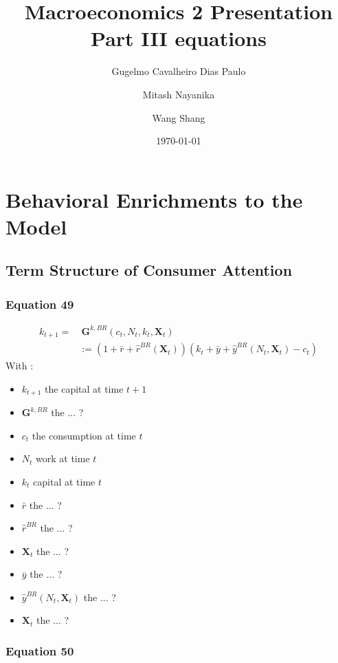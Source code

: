 \documentclass{article}
\title{Macroeconomics 2 Presentation \\ Part III equations}
\author{Gugelmo Cavalheiro Dias Paulo \\ \and Mitash Nayanika \\ \and Wang Shang}
\date{\today}
\begin{document}
\maketitle

\section{Behavioral Enrichments to the Model}

\subsection{Term Structure of Consumer Attention}

\subsubsection*{Equation 49}

\begin{equation} \tag{49}
    \begin{split}
        k_{t+1}= &\  \textbf{G}^{k,BR}(c_{t},N_{t},k_{t},\textbf{X}_{t}) \\
        & := (1+\bar{r}+\hat{r}^{BR}(\textbf{X}_t))(k_{t}+\bar{y}+\hat{y}^{BR}(N_{t},\textbf{X}_t)-c_{t})
    \end{split}
\end{equation}
With : 
\begin{itemize}
    \item $k_{t+1}$ the capital at time $t+1$
    \item $\textbf{G}^{k,BR}$ the ... ?
    \item $c_t$ the consumption at time $t$
    \item $N_{t}$ work at time $t$
    \item $k_t$ capital at time $t$
    \item $\bar{r}$ the ... ?
    \item $\hat{r}^{BR}$ the ... ?
    \item $\textbf{X}_t$ the ... ?
    \item $\bar{y}$ the ... ?
    \item $\hat{y}^{BR}(N_t,\textbf{X}_{t})$ the ... ?
    \item $\textbf{X}_{t}$ the ... ?  
\end{itemize}

\subsubsection*{Equation 50}
\end{document}
